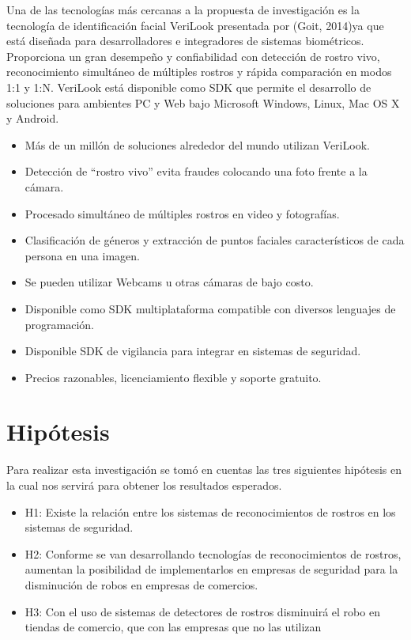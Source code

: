 \documentclass{comjnl}
\begin{document}
Una de las tecnologías más cercanas a la propuesta de investigación es la tecnología de identificación facial VeriLook presentada por (Goit, 2014)ya que está diseñada para desarrolladores e integradores de sistemas biométricos. Proporciona un gran desempeño y confiabilidad con detección de rostro vivo, reconocimiento simultáneo de múltiples rostros y rápida comparación en modos 1:1 y 1:N. VeriLook está disponible como SDK que permite el desarrollo de soluciones para ambientes PC y Web bajo Microsoft Windows, Linux, Mac OS X y Android. 
\begin{itemize}
\item Más de un millón de soluciones alrededor del mundo utilizan VeriLook. 
\item Detección de “rostro vivo” evita fraudes colocando una foto frente a la cámara. 
\item Procesado simultáneo de múltiples rostros en video y fotografías. 
\item Clasificación de géneros y extracción de puntos faciales característicos de cada persona en una imagen. 
\item Se pueden utilizar Webcams u otras cámaras de bajo costo. 
\item Disponible como SDK multiplataforma compatible con diversos lenguajes de programación. 
\item Disponible SDK de vigilancia para integrar en sistemas de seguridad. 
\item Precios razonables, licenciamiento flexible y soporte gratuito.
\end{itemize}

\section{Hipótesis} \label{Model}
Para realizar esta investigación se tomó en cuentas las tres siguientes hipótesis en la cual nos servirá para obtener los resultados esperados.\\

\begin{itemize}
\item H1: Existe la relación entre los sistemas de reconocimientos de rostros en los sistemas de seguridad.
\item H2: Conforme se van desarrollando tecnologías de reconocimientos de rostros, aumentan la posibilidad de implementarlos en empresas de seguridad para la disminución de robos en empresas de comercios. 
\item H3: Con el uso de sistemas de detectores de rostros disminuirá el robo en tiendas de comercio, que con las empresas que no las utilizan
\end{itemize}
\end{document}
